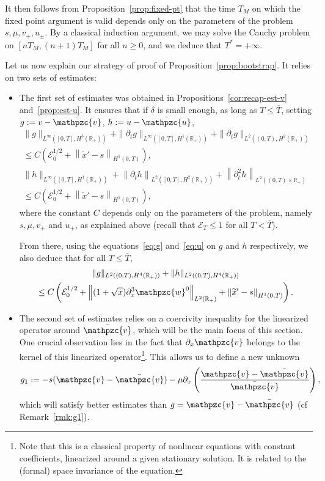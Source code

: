 \documentclass[AHL,Unicode,longabstracts,published]{cedram}
\newcommand{\R}{\mathbb{R}}
\newcommand{\p}{\partial}
\newcommand{\bv}{\bar{\mathpzc{v}}}
\newcommand{\bu}{\bar{\mathpzc{u}}}
\newcommand{\cE}{\mathcal E}
\newcommand{\tv}{\mathpzc{v}}
\newcommand{\tw}{\mathpzc{w}}
\newcommand{\tx}{\widetilde{x}}
\newcommand{\tx}{\widetilde{x}}
\begin{document}
It then follows from Proposition~\ref{prop:fixed-pt} that the time $T_M$ on which the fixed point argument is valid depends only on the parameters of the problem $s,\mu, v_+,u_\pm$. By a classical induction argument, we may solve the Cauchy problem on $[nT_M, (n+1)T_M]$ for all $n\geq 0$, and we deduce that $T^*=+\infty$.


Let us now explain our strategy of proof of Proposition~\ref{prop:bootstrap}. It relies on two sets of estimates:
\begin{itemize}
\item The first set of estimates was obtained in Propositions~\ref{cor:recap-est-v} and~\ref{prop:est-u}. It ensures that if $\delta$ is small enough, as long as $T\leq \overline{T}$, setting $g:=v-\bv$, $h := u -\bu$,
\begin{align}
\|g\|_{L^\infty\left([0,T], H^3(\R_+)\right)} + \|\partial_t g\|_{L^\infty\left([0,T], H^1(\R_+)\right)} + \|\p_t g\|_{L^2\left((0,T), H^2(\R_+)\right)}\label{est:g-global}\\
\leq C \left(\cE_0^{1/2} + \left\|\tx'-s\right\|_{H^1(0,T)}\right),\nonumber
\\
\|h\|_{L^\infty\left([0,T], H^1(\R_+)\right)}+ \left\|\partial_t h \right\|_{L^2\left([0,T], H^2(\R_+)\right)} + \left\|\partial^2_t h\right\|_{L^2\left((0,T)\times \R_+\right)}\label{est:h-global}\\
\leq C (\cE_0^{1/2} + \left\|\tx'-s\right\|_{H^1(0,T)}),\nonumber
\end{align}
where the constant $C$ depends only on the parameters of the problem, namely $s,\mu,v_+$ and $u_+$, as explained above (recall that $\cE_T\leq 1$ for all $T<\overline{T}$).



From there, using the equations~\eqref{eq:g} and~\eqref{eq:u} on $g$ and $h$ respectively, we also deduce that for all $T\leq \overline{T}$,
\begin{multline}\label{est:g-h-global-bis}
\|g\|_{L^2\left((0,T), H^4(\R_+)\right)} + \|h\|_{L^2\left((0,T), H^4(\R_+)\right)}\\
\leq C \left(\cE_0^{1/2} +\left\|(1+\sqrt{x})\p_x^3 \tw^0\right\|_{L^2(\R_+)}+ \left\|\tx'-s\right\|_{H^1(0,T)}\right).
\end{multline}



\item The second set of estimates relies on a coercivity inequality for the linearized operator around $\bv$, which will be the main focus of this section. One crucial observation lies in the fact that $\p_x \bv$ belongs to the kernel of this linearized operator\footnote{Note that this is a classical property of nonlinear equations with constant coefficients, linearized around a given stationary solution. It is related to the (formal) space invariance of the equation.}. This allows us to define a new unknown
\begin{equation}\label{def:g1}
g_1:= - s(\tv - \bv) - \mu \p_x\left(\frac{\tv - \bv}{\bv}\right),
\end{equation} which will satisfy better estimates than $g=\tv-\bv$ (cf Remark~\ref{rmk:g1}).
\end{itemize}
\end{document}
